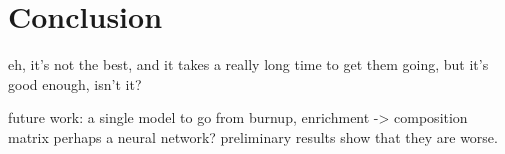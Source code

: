 \section{Conclusion}

eh, it's not the best, and it takes a really long time to get them going,
but it's good enough, isn't it?

future work:
a single model to go from
burnup, enrichment -> composition matrix
perhaps a neural network? preliminary results
show that they are worse. 